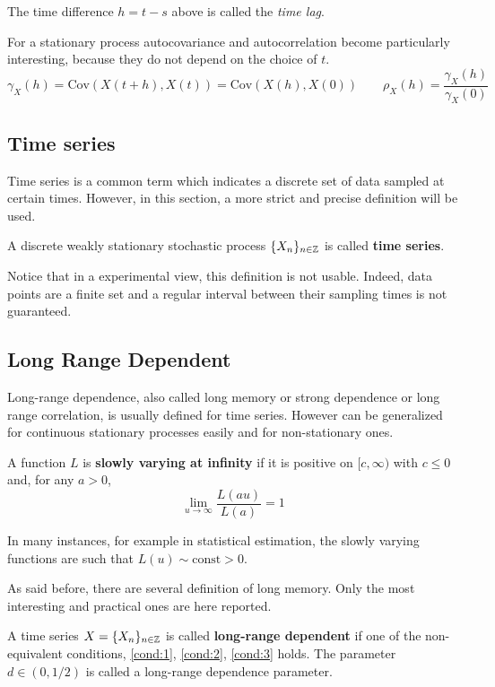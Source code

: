 The time difference $h = t - s$ above is called the \emph{time lag}.

For a stationary process autocovariance and autocorrelation become particularly interesting, because they do not depend on the choice of $t$.
\begin{equation*}
	\gamma_X(h) = \text{Cov}(X(t+h), X(t)) = \text{Cov}(X(h), X(0)) \qquad \rho_X(h) = \frac{\gamma_X(h)}{\gamma_X(0)}
\end{equation*}

\subsection{Time series}
Time series is a common term which indicates a discrete set of data sampled at certain times. However, in this section, a more strict and precise definition will be used.
\begin{definition}
	A discrete weakly stationary stochastic process $\{X_n\}_{n \in \mathbb{Z}}$ is called \textbf{time series}.
\end{definition}

Notice that in a experimental view, this definition is not usable. Indeed, data points are a finite set and a regular interval between their sampling times is not guaranteed.

\subsection{Long Range Dependent}
Long-range dependence, also called long memory or strong dependence or long range correlation, is usually defined for time series. However can be generalized for continuous stationary processes easily\cite{pipiras_taqqu_2017} and for non-stationary ones\cite{Movahed_2006}.

\begin{definition}
	A function $L$ is \textbf{slowly varying at infinity} if it is positive on $[c, \infty)$ with $c \le 0$ and, for any $a > 0$,
	\begin{equation*}
		\lim_{u \to \infty} \frac{L(au)}{L(a)} = 1
	\end{equation*}
\end{definition}

In many instances, for example in statistical estimation, the slowly varying
functions are such that $L(u) \sim \text{const} > 0$. 

As said before, there are several definition of long memory. Only the most interesting and practical ones are here reported.
\begin{definition}
	A time series $X = \{ X_n \}_{n \in \mathbb{Z}}$ is called \textbf{long-range dependent} if one of the non-equivalent conditions, \autoref{cond:1}, \autoref{cond:2}, \autoref{cond:3} holds. The parameter $d \in (0, 1/2)$ is called a \textnormal{long-range dependence parameter}.
\end{definition}

